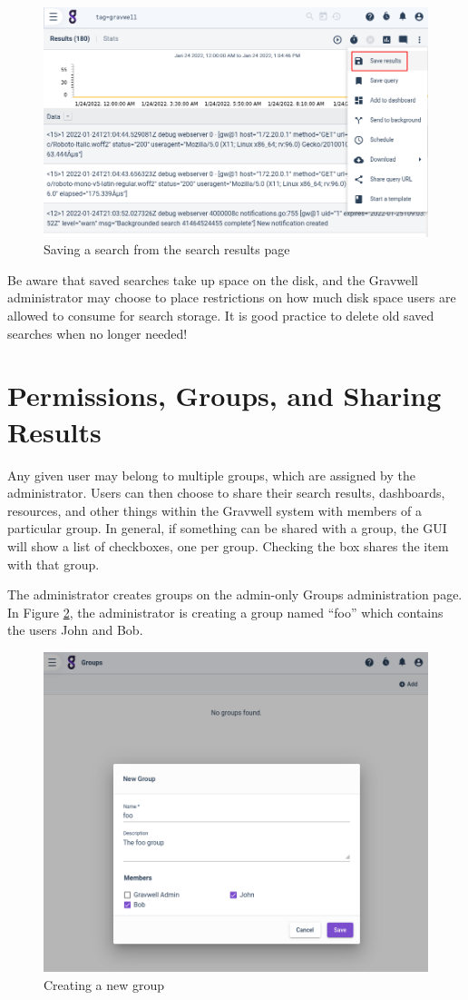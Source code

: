 \begin{figure}
	\includegraphics[width=0.8\linewidth]{images/save-search-menu.png}
	\caption{Saving a search from the search results page}
	\label{fig:save-search-menu}
\end{figure}

Be aware that saved searches take up space on the disk, and the
Gravwell administrator may choose to place restrictions on how much disk
space users are allowed to consume for search storage. It is good
practice to delete old saved searches when no longer needed!

\clearpage
\section{Permissions, Groups, and Sharing Results}

Any given user may belong to multiple groups, which are assigned by the
administrator. Users can then choose to share their search results,
dashboards, resources, and other things within the Gravwell system with
members of a particular group. In general, if something can be shared
with a group, the GUI will show a list of checkboxes, one per group.
Checking the box shares the item with that group.

The administrator creates groups on the admin-only Groups
administration page. In Figure \ref{fig:newgroup-foo}, the administrator is
creating a group named ``foo'' which contains the users John and Bob.

\begin{figure}
	\includegraphics[width=0.8\linewidth]{images/newgroup-foo.png}
	\caption{Creating a new group}
	\label{fig:newgroup-foo}
\end{figure}

